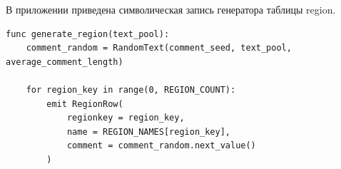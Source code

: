 \setcounter{appendixlstbase}{\value{lstlisting}}
\renewcommand{\thelstlisting}{\Asbuk{appendicesnum}.\number\numexpr\value{lstlisting}-\value{appendixlstbase}\relax}
\label{appendix:region}

В приложении приведена символическая запись генератора таблицы
region.

\begin{lstlisting}[style=reportpseudocode,caption={Формирование таблицы region},label={lst:app-region}]
func generate_region(text_pool):
    comment_random = RandomText(comment_seed, text_pool, average_comment_length)

    for region_key in range(0, REGION_COUNT):
        emit RegionRow(
            regionkey = region_key,
            name = REGION_NAMES[region_key],
            comment = comment_random.next_value()
        )
\end{lstlisting}
